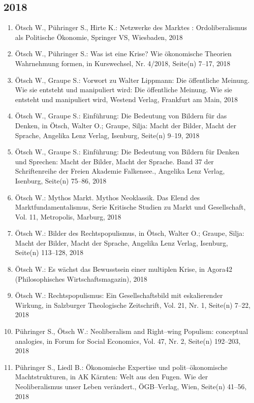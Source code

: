 \subsection*{2018}
\begin{enumerate}
    	 \item Ötsch W., Pühringer S., Hirte K.: Netzwerke des Marktes : Ordoliberalismus als Politische Ökonomie, Springer VS, Wiesbaden, 2018
	 \item Ötsch W., Pühringer S.: Was ist eine Krise? Wie ökonomische Theorien Wahrnehmung formen, in Kurswechsel, Nr. 4/2018, Seite(n) 7--17, 2018
	 \item Ötsch W., Graupe S.: Vorwort zu Walter Lippmann: Die öffentliche Meinung. Wie sie entsteht und manipuliert wird: Die öffentliche Meinung. Wie sie entsteht und manipuliert wird, Westend Verlag, Frankfurt am Main, 2018
	 \item Ötsch W., Graupe S.: Einführung: Die Bedeutung von Bildern für das Denken, in Ötsch, Walter O.; Graupe, Silja: Macht der Bilder, Macht der Sprache, Angelika Lenz Verlag, Isenburg, Seite(n) 9--19, 2018
	 \item Ötsch W., Graupe S.: Einführung: Die Bedeutung von Bildern für Denken und Sprechen: Macht der Bilder, Macht der Sprache. Band 37 der Schriftenreihe der Freien Akademie Falkensee., Angelika Lenz Verlag, Isenburg, Seite(n) 75–86, 2018
	 \item Ötsch W.: Mythos Markt. Mythos Neoklassik. Das Elend des Marktfundamentalismus, Serie Kritische Studien zu Markt und Gesellschaft, Vol. 11, Metropolis, Marburg, 2018
	 \item Ötsch W.: Bilder des Rechtspopulismus, in Ötsch, Walter O.; Graupe, Silja: Macht der Bilder, Macht der Sprache, Angelika Lenz Verlag, Isenburg, Seite(n) 113--128, 2018
	 \item Ötsch W.: Es wächst das Bewusstsein einer multiplen Krise, in Agora42 (Philosophisches Wirtschaftsmagazin), 2018
	 \item Ötsch W.: Rechtspopulismus: Ein Gesellschaftsbild mit eskalierender Wirkung, in Salzburger Theologische Zeitschrift, Vol. 21, Nr. 1, Seite(n) 7--22, 2018
	 \item Pühringer S., Ötsch W.: Neoliberalism and Right--wing Populism: conceptual analogies, in Forum for Social Economics, Vol. 47, Nr. 2, Seite(n) 192--203, 2018
	 \item Pühringer S., Liedl B.: Ökonomische Expertise und polit--ökonomische Machtstrukturen, in AK Kärnten: Welt aus den Fugen. Wie der Neoliberalismus unser Leben verändert., ÖGB--Verlag, Wien, Seite(n) 41--56, 2018

\end{enumerate}
